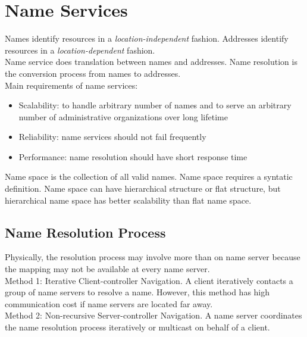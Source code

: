 \chapter{Name Services}
\begin{multicols*}{2}

\noindent Names identify resources in a \emph{location-independent} fashion. Addresses identify resources in a \emph{location-dependent} fashion.\\

\noindent Name service does translation between names and addresses. Name resolution is the conversion process from names to addresses.\\

\noindent Main requirements of name services:
\begin{itemize}
  \item Scalability: to handle arbitrary number of names and to serve an arbitrary number of administrative organizations over long lifetime
  \item Reliability: name services should not fail frequently
  \item Performance: name resolution should have short response time
\end{itemize}

\noindent Name space is the collection of all valid names. Name space requires a syntatic definition. Name space can have hierarchical structure or flat structure, but hierarchical name space has better scalability than flat name space.

\section{Name Resolution Process}

\noindent Physically, the resolution process may involve more than on name server because the mapping may not be available at every name server.\\

\noindent Method 1: Iterative Client-controller Navigation. A client iteratively contacts a group of name servers to resolve a name. However, this method has high communication cost if name servers are located far away.\\

\noindent Method 2: Non-recursive Server-controller Navigation. A name server coordinates the name resolution process iteratively or multicast on behalf of a client.\\


\end{multicols*}
